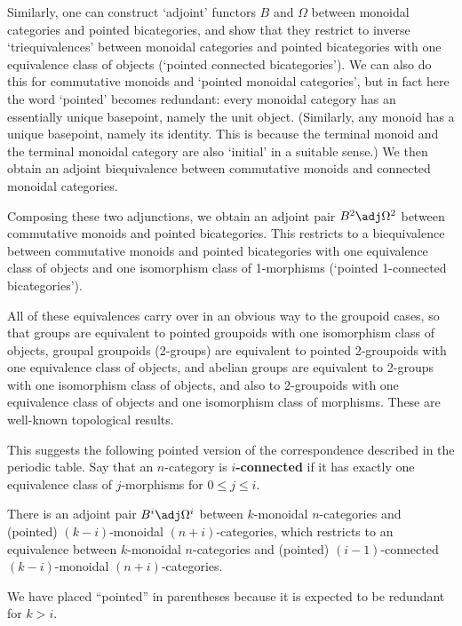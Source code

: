 \documentclass[12pt]{amsart}
\begin{document}
Similarly, one can construct `adjoint' functors $B$ and $\Omega$
between monoidal categories and pointed bicategories, and show that
they restrict to inverse `triequivalences' between monoidal categories
and pointed bicategories with one equivalence class of objects
(`pointed connected bicategories').  We can also do this for
commutative monoids and `pointed monoidal categories', but in fact
here the word `pointed' becomes redundant: every monoidal category has
an essentially unique basepoint, namely the unit object.  (Similarly,
any monoid has a unique basepoint, namely its identity.  This is
because the terminal monoid and the terminal monoidal category are
also `initial' in a suitable sense.)  We then obtain an adjoint
biequivalence between commutative monoids and connected monoidal
categories.

Composing these two adjunctions, we obtain an adjoint pair $B^2\adj
\Omega^2$ between commutative monoids and pointed bicategories.  This
restricts to a biequivalence between commutative monoids and pointed
bicategories with one equivalence class of objects and one isomorphism
class of 1-morphisms (`pointed 1-connected bicategories').

All of these equivalences carry over in an obvious way to the groupoid
cases, so that groups are equivalent to pointed groupoids with one
isomorphism class of objects, groupal groupoids (2-groups) are
equivalent to pointed 2-groupoids with one equivalence class of
objects, and abelian groups are equivalent to 2-groups with one
isomorphism class of objects, and also to 2-groupoids with one
equivalence class of objects and one isomorphism class of morphisms.
These are well-known topological results.

This suggests the following pointed version of the correspondence
described in the periodic table.  Say that an $n$-category is
\textbf{$i$-connected} if it has exactly one equivalence class of
$j$-morphisms for $0\le j \le i$.

\begin{hyp} \label{hyp:delooping}
  There is an adjoint pair $B^i\adj \Omega^i$ between $k$-monoidal
  $n$-categories and (pointed) $(k-i)$-monoidal $(n+i)$-categories,
  which restricts to an equivalence between $k$-monoidal
  $n$-categories and (pointed) $(i-1)$-connected $(k-i)$-monoidal
  $(n+i)$-categories.
\end{hyp}
\noindent
We have placed ``pointed'' in parentheses because it is 
expected to be redundant for $k>i$.
\end{document}
